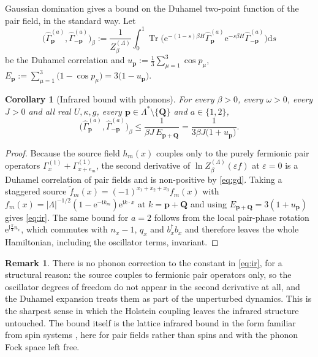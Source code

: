 \documentclass[11pt]{article}
\numberwithin{equation}{section}
\newcommand{\e}{\mathrm{e}}
\newcommand{\ii}{\mathrm{i}}
\newcommand{\dd}{\mathrm{d}}
\newcommand{\Tr}{\operatorname{Tr}}
\newcommand{\Lamb}{\Lambda}
\newcommand{\Lambstar}{\Lambda^{*}}
\newcommand{\Gam}{\Gamma}
\newtheorem{corollary}[theorem]{Corollary}
\theoremstyle{definition}
\newtheorem{remark}[theorem]{Remark}
\begin{document}
Gaussian domination gives a bound on the Duhamel two-point function of the pair field,
in the standard way. Let
\begin{equation}
\big(\hat\Gam^{(a)}_{\mathbf p},\hat\Gam^{(a)}_{-\mathbf p}\big)_{\beta}
:=\frac{1}{Z^{(\Lamb)}_{\beta}}\int_{0}^{1}\Tr\Big(\e^{-(1-s)\beta H}\hat\Gam^{(a)}_{\mathbf p}\e^{-s\beta H}\hat\Gam^{(a)}_{-\mathbf p}\Big)\dd s
\label{eq:duhamel}
\end{equation}
be the Duhamel correlation and $u_{\mathbf p}:=\frac13\sum_{\mu=1}^{3}\cos p_{\mu}$,
$E_{\mathbf p}:=\sum_{\mu=1}^{3}\big(1-\cos p_{\mu}\big)=3\big(1-u_{\mathbf p}\big)$.

\begin{corollary}[Infrared bound with phonons]\label{cor:ir}
For every $\beta>0$, every $\omega>0$, every $J>0$ and all real $U,\kappa,g$, every
$\mathbf p\in\Lambstar\setminus\{\mathbf Q\}$ and $a\in\{1,2\}$,
\begin{equation}
\big(\hat\Gam^{(a)}_{\mathbf p},\hat\Gam^{(a)}_{-\mathbf p}\big)_{\beta}\le\frac{1}{\beta J\,E_{\mathbf p+\mathbf Q}}
=\frac{1}{3\beta J\big(1+u_{\mathbf p}\big)} .
\label{eq:ir}
\end{equation}
\end{corollary}

\begin{proof}
Because the source field $h_{m}(x)$ couples only to the purely fermionic pair
operators $\Gam^{(1)}_{x}+\Gam^{(1)}_{x+e_{m}}$, the second derivative of
$\ln Z^{(\Lamb)}_{\beta}(\varepsilon f)$ at $\varepsilon=0$ is a Duhamel correlation of
pair fields and is non-positive by \eqref{eq:gd}. Taking a staggered source
$\tilde f_{m}(x)=(-1)^{x_{1}+x_{2}+x_{3}}f_{m}(x)$ with
$f_{m}(x)=|\Lamb|^{-1/2}(1-\e^{-\ii k_{m}})\e^{\ii k\cdot x}$ at $k=\mathbf p+\mathbf Q$
and using $E_{\mathbf p+\mathbf Q}=3(1+u_{\mathbf p})$ gives \eqref{eq:ir}. The same bound for
$a=2$ follows from the local pair-phase rotation $\e^{\ii\frac{\pi}{4}n_{x}}$, which
commutes with $n_{x}-1$, $q_{x}$ and $b_{x}^{\dagger}b_{x}$ and therefore leaves the
whole Hamiltonian, including the oscillator terms, invariant.
\end{proof}

\begin{remark}\label{rem:no-phonon-correction}
There is no phonon correction to the constant in \eqref{eq:ir}, for a structural reason: the
source couples to fermionic pair operators only, so the oscillator degrees of freedom
do not appear in the second derivative at all, and the Duhamel expansion treats them as
part of the unperturbed dynamics. This is the sharpest sense in which the Holstein
coupling leaves the infrared structure untouched. The bound itself is the lattice
infrared bound in the form familiar from spin systems \cite{frohlich1976,dyson1978},
here for pair fields rather than spins and with the phonon Fock space left free.
\end{remark}
\end{document}
